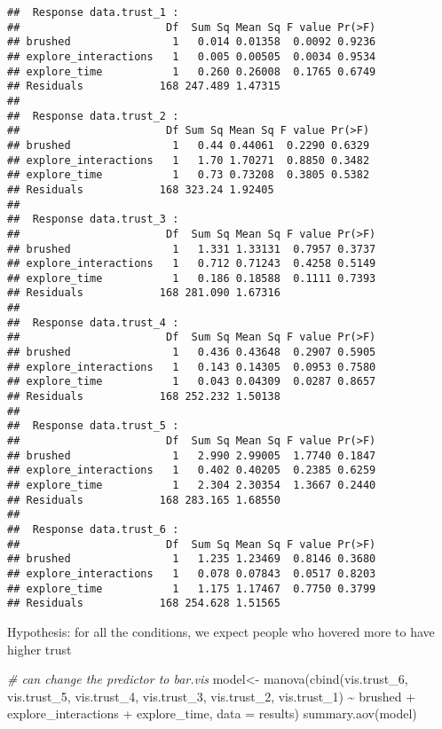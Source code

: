 \documentclass[
]{article}
\newenvironment{Shaded}{\begin{snugshade}}{\end{snugshade}}
\newcommand{\AttributeTok}[1]{\textcolor[rgb]{0.77,0.63,0.00}{#1}}
\newcommand{\CommentTok}[1]{\textcolor[rgb]{0.56,0.35,0.01}{\textit{#1}}}
\newcommand{\FunctionTok}[1]{\textcolor[rgb]{0.00,0.00,0.00}{#1}}
\newcommand{\NormalTok}[1]{#1}
\newcommand{\OtherTok}[1]{\textcolor[rgb]{0.56,0.35,0.01}{#1}}
\newcommand{\SpecialCharTok}[1]{\textcolor[rgb]{0.00,0.00,0.00}{#1}}
\begin{document}
\begin{verbatim}
##  Response data.trust_1 :
##                       Df  Sum Sq Mean Sq F value Pr(>F)
## brushed                1   0.014 0.01358  0.0092 0.9236
## explore_interactions   1   0.005 0.00505  0.0034 0.9534
## explore_time           1   0.260 0.26008  0.1765 0.6749
## Residuals            168 247.489 1.47315               
## 
##  Response data.trust_2 :
##                       Df Sum Sq Mean Sq F value Pr(>F)
## brushed                1   0.44 0.44061  0.2290 0.6329
## explore_interactions   1   1.70 1.70271  0.8850 0.3482
## explore_time           1   0.73 0.73208  0.3805 0.5382
## Residuals            168 323.24 1.92405               
## 
##  Response data.trust_3 :
##                       Df  Sum Sq Mean Sq F value Pr(>F)
## brushed                1   1.331 1.33131  0.7957 0.3737
## explore_interactions   1   0.712 0.71243  0.4258 0.5149
## explore_time           1   0.186 0.18588  0.1111 0.7393
## Residuals            168 281.090 1.67316               
## 
##  Response data.trust_4 :
##                       Df  Sum Sq Mean Sq F value Pr(>F)
## brushed                1   0.436 0.43648  0.2907 0.5905
## explore_interactions   1   0.143 0.14305  0.0953 0.7580
## explore_time           1   0.043 0.04309  0.0287 0.8657
## Residuals            168 252.232 1.50138               
## 
##  Response data.trust_5 :
##                       Df  Sum Sq Mean Sq F value Pr(>F)
## brushed                1   2.990 2.99005  1.7740 0.1847
## explore_interactions   1   0.402 0.40205  0.2385 0.6259
## explore_time           1   2.304 2.30354  1.3667 0.2440
## Residuals            168 283.165 1.68550               
## 
##  Response data.trust_6 :
##                       Df  Sum Sq Mean Sq F value Pr(>F)
## brushed                1   1.235 1.23469  0.8146 0.3680
## explore_interactions   1   0.078 0.07843  0.0517 0.8203
## explore_time           1   1.175 1.17467  0.7750 0.3799
## Residuals            168 254.628 1.51565
\end{verbatim}

Hypothesis: for all the conditions, we expect people who hovered more to
have higher trust

\begin{Shaded}
\begin{Highlighting}[]
\CommentTok{\# can change the predictor to bar.vis}
\NormalTok{model}\OtherTok{\textless{}{-}} \FunctionTok{manova}\NormalTok{(}\FunctionTok{cbind}\NormalTok{(vis.trust\_6, }
\NormalTok{                     vis.trust\_5, }
\NormalTok{                     vis.trust\_4, }
\NormalTok{                     vis.trust\_3, }
\NormalTok{                     vis.trust\_2, }
\NormalTok{                     vis.trust\_1) }\SpecialCharTok{\textasciitilde{}}\NormalTok{ brushed }\SpecialCharTok{+}\NormalTok{ explore\_interactions }\SpecialCharTok{+}\NormalTok{ explore\_time, }
               \AttributeTok{data =}\NormalTok{ results)}
\FunctionTok{summary.aov}\NormalTok{(model)}
\end{Highlighting}
\end{Shaded}
\end{document}
